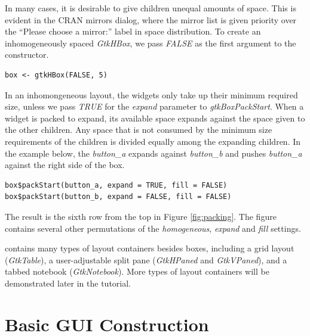\documentclass[article]{jss}
\begin{document}
In many cases, it is desirable to give children unequal amounts of space.
This is evident in the CRAN mirrors dialog, where the mirror list is given
priority over the ``Please choose a mirror:'' label in space distribution.
To create an inhomogeneously spaced \emph{GtkHBox}, we pass \emph{FALSE} as the first
argument to the constructor.
\begin{verbatim}
box <- gtkHBox(FALSE, 5)
\end{verbatim}
In an inhomongeneous layout, the widgets only take up their minimum required
size, unless we pass \emph{TRUE} for the \emph{expand} parameter to
\emph{gtkBoxPackStart}. When a widget is packed to expand, its available space
expands against the space given to the other children. Any space that is
not consumed by the minimum size requirements of the children is divided
equally among the expanding children. In the example below, the \emph{button\_a}
expands against \emph{button\_b} and pushes \emph{button\_a} against the right 
side of the box.
\begin{verbatim}
box$packStart(button_a, expand = TRUE, fill = FALSE)
box$packStart(button_b, expand = FALSE, fill = FALSE)
\end{verbatim}
The result is the sixth row from the top in Figure \ref{fig:packing}. The
figure contains several other permutations of the \emph{homogeneous}, \emph{expand} 
and \emph{fill} settings.

 contains many types of layout containers besides boxes, including 
a grid layout (\emph{GtkTable}), a user-adjustable split pane (\emph{GtkHPaned}
and \emph{GtkVPaned}), and a tabbed notebook (\emph{GtkNotebook}). More types of
layout containers will be demonstrated later in the tutorial.

\section{Basic GUI Construction}

\end{document}
